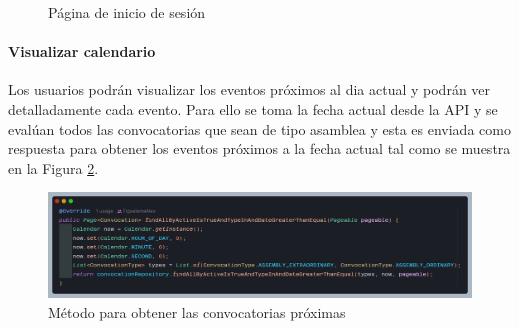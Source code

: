 \begin{figure}[H]
    \centering
    \caption{Página de inicio de sesión}
    \label{fig:app-login}
\end{figure}

\paragraph{Visualizar calendario}

Los usuarios podrán visualizar los eventos próximos al dia actual y podrán ver detalladamente cada evento.
Para ello se toma la fecha actual desde la API y se evalúan todos las convocatorias que sean de tipo asamblea y esta es enviada como respuesta para obtener los eventos próximos a la fecha actual tal como se muestra en la Figura \ref{fig:api-event-filter}.

\begin{figure}[H]
    \centering
    \includegraphics[width=1\textwidth]{resources/images/api-calendar}
    \caption{Método para obtener las convocatorias próximas}
    \label{fig:api-event-filter}
\end{figure}


